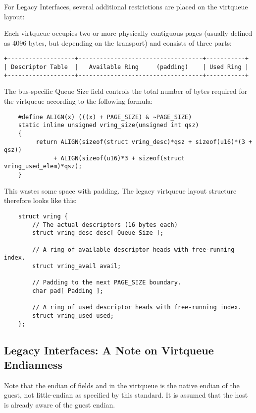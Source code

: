 For Legacy Interfaces, several additional
restrictions are placed on the virtqueue layout:

Each virtqueue occupies two or more physically-contiguous pages
(usually defined as 4096 bytes, but depending on the transport)
and consists of three parts:

\begin{verbatim}
+-------------------+-----------------------------------+-----------+
| Descriptor Table  |   Available Ring     (padding)    | Used Ring |
+-------------------+-----------------------------------+-----------+
\end{verbatim}

The bus-specific Queue Size field controls the total number of bytes
required for the virtqueue according to the following formula:

\begin{lstlisting}
	#define ALIGN(x) (((x) + PAGE_SIZE) & ~PAGE_SIZE)
	static inline unsigned vring_size(unsigned int qsz)
	{
	     return ALIGN(sizeof(struct vring_desc)*qsz + sizeof(u16)*(3 + qsz))
	          + ALIGN(sizeof(u16)*3 + sizeof(struct vring_used_elem)*qsz);
	}
\end{lstlisting}

This wastes some space with padding.
The legacy virtqueue layout structure therefore looks like this:

\begin{lstlisting}
	struct vring {
		// The actual descriptors (16 bytes each)
		struct vring_desc desc[ Queue Size ];

		// A ring of available descriptor heads with free-running index.
		struct vring_avail avail;

		// Padding to the next PAGE_SIZE boundary.
		char pad[ Padding ];

		// A ring of used descriptor heads with free-running index.
		struct vring_used used;
	};
\end{lstlisting}

\subsection{Legacy Interfaces: A Note on Virtqueue Endianness}\label{sec:Basic Facilities of a Virtio Device / Virtqueues / Legacy Interfaces: A Note on Virtqueue Endianness}

Note that the endian of fields and in the virtqueue is the native
endian of the guest, not little-endian as specified by this standard.
It is assumed that the host is already aware of the guest endian.

